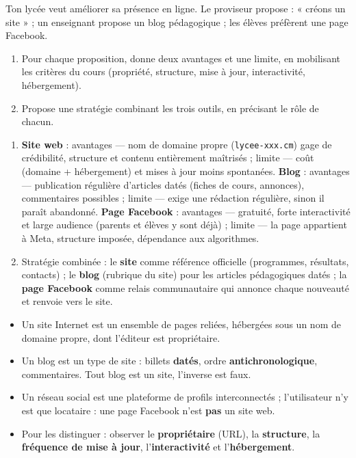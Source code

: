 \documentclass[11pt]{article}
\newcommand{\cle}[1]{{\popxbold\color{popdark}#1}}
\begin{document}
\begin{exercice}
Ton lycée veut améliorer sa présence en ligne. Le proviseur propose : « créons un site » ; un enseignant propose un blog pédagogique ; les élèves préfèrent une page Facebook.
\begin{enumerate}
  \item Pour chaque proposition, donne deux avantages et une limite, en mobilisant les critères du cours (propriété, structure, mise à jour, interactivité, hébergement).
  \item Propose une stratégie combinant les trois outils, en précisant le rôle de chacun.
\end{enumerate}
\end{exercice}

\begin{corrige}[Exercice]
\begin{enumerate}
  \item \textbf{Site web} : avantages — nom de domaine propre (\texttt{lycee-xxx.cm}) gage de crédibilité, structure et contenu entièrement maîtrisés ; limite — coût (domaine + hébergement) et mises à jour moins spontanées. \textbf{Blog} : avantages — publication régulière d'articles datés (fiches de cours, annonces), commentaires possibles ; limite — exige une rédaction régulière, sinon il paraît abandonné. \textbf{Page Facebook} : avantages — gratuité, forte interactivité et large audience (parents et élèves y sont déjà) ; limite — la page appartient à Meta, structure imposée, dépendance aux algorithmes.
  \item Stratégie combinée : le \textbf{site} comme référence officielle (programmes, résultats, contacts) ; le \textbf{blog} (rubrique du site) pour les articles pédagogiques datés ; la \textbf{page Facebook} comme relais communautaire qui annonce chaque nouveauté et renvoie vers le site.
\end{enumerate}
\end{corrige}

\begin{aretenir}
\begin{itemize}
  \item Un \cle{site Internet} est un ensemble de pages reliées, hébergées sous un nom de domaine propre, dont l'éditeur est propriétaire.
  \item Un \cle{blog} est un type de site : billets \textbf{datés}, ordre \textbf{antichronologique}, commentaires. Tout blog est un site, l'inverse est faux.
  \item Un \cle{réseau social} est une plateforme de profils interconnectés ; l'utilisateur n'y est que locataire : une page Facebook n'est \textbf{pas} un site web.
  \item Pour les distinguer : observer le \textbf{propriétaire} (URL), la \textbf{structure}, la \textbf{fréquence de mise à jour}, l'\textbf{interactivité} et l'\textbf{hébergement}.
\end{itemize}
\end{aretenir}
\end{document}
